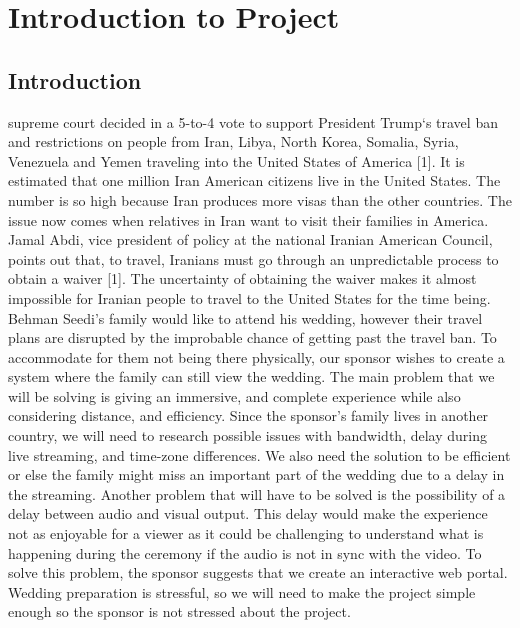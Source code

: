 \documentclass[onecolumn, draftclsnofoot,10pt, compsoc]{IEEEtran}
\begin{document}
\section{Introduction to Project}
    \subsection{Introduction}
     supreme court decided in a 5-to-4 vote to support President Trump`s travel ban and restrictions on people from Iran, Libya, North Korea, Somalia, Syria, Venezuela and Yemen traveling into the United States of America [1]. 
    It is estimated that one million Iran American citizens live in the United States. 
    The number is so high because Iran produces more visas than the other countries. 
    The issue now comes when relatives in Iran want to visit their families in America.
    Jamal Abdi, vice president of policy at the national Iranian American Council, points out that, to travel, Iranians must go through an unpredictable process to obtain a waiver [1]. 
    The uncertainty of obtaining the waiver makes it almost impossible for Iranian people to travel to the United States for the time being. 
    Behman Seedi's family would like to attend his wedding, however their travel plans are disrupted by the improbable chance of getting past the travel ban. 
    To accommodate for them not being there physically, our sponsor wishes to create a system where the family can still view the wedding.
    The main problem that we will be solving is giving an immersive, and complete experience while also considering distance, and efficiency.
    Since the sponsor's family lives in another country, we will need to research possible issues with bandwidth, delay during live streaming, and time-zone differences.
    We also need the solution to be efficient or else the family might miss an important part of the wedding due to a delay in the streaming.
    Another problem that will have to be solved is the possibility of a delay between audio and visual output. 
    This delay would make the experience not as enjoyable for a viewer as it could be challenging to understand what is happening during the ceremony if the audio is not in sync with the video.
    To solve this problem, the sponsor suggests that we create an interactive web portal. 
    Wedding preparation is stressful, so we will need to make the project simple enough so the sponsor is not stressed about the project. 
    \newline 
\end{document}
